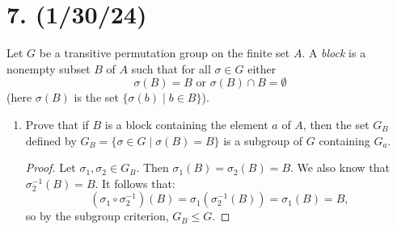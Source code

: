 \documentclass{article}
\begin{document}
\section*{7. (1/30/24)}

Let $G$ be a transitive permutation group on the finite set $A$. A \emph{block} is a nonempty subset $B$ of $A$ such that for all $\sigma \in G$ either 
\begin{equation*}
    \sigma(B) = B \text{ or }\sigma(B) \cap B = \emptyset
\end{equation*}
(here $\sigma(B)$ is the set $\{ \sigma(b) \mid b \in B \}$).

\begin{enumerate}[itemsep=0em, label=(\alph*)]
    \item Prove that if $B$ is a block containing the element $a$ of $A$, then the set $G_B$ defined by $G_B = \{ \sigma \in G \mid \sigma(B) = B \}$ is a subgroup of $G$ containing $G_a$.
        \begin{proof}
            Let $\sigma_1, \sigma_2 \in G_B$. Then $\sigma_1(B) = \sigma_2(B) = B$. We also know that $\sigma_2^{-1}(B) = B$. It follows that:
            \begin{equation*}
                (\sigma_1 \circ \sigma_2^{-1})(B) = \sigma_1(\sigma_2^{-1}(B)) = \sigma_1(B) = B,
            \end{equation*}
            so by the subgroup criterion, $G_B \leq G$.


\end{proof}
\end{enumerate}
\end{document}
